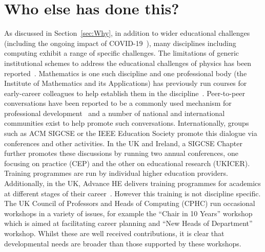 \documentclass[sigconf]{acmart}
\begin{document}
\section{Who else has done this?}
As discussed in Section~\ref{sec:Why}, in addition to wider
educational challenges (including the ongoing impact of
COVID-19~\cite{itnowdigedu:2021,crick-et-ala:iticse2021}), many
disciplines including computing exhibit a range of specific
challenges. The limitations of generic institutional schemes to
address the educational challenges of physics has been
reported~\cite{Magueijo2009}. Mathematics is one such discipline and
one professional body (the Institute of Mathematics and its
Applications) has previously run courses for early-career colleagues
to help establish them in the discipline~\cite{IMA}. Peer-to-peer
conversations have been reported to be a commonly used mechanism for
professional development~\cite{King2004} and a number of national and
international communities exist to help promote such
conversations. Internationally, groups such as ACM SIGCSE or the IEEE
Education Society promote this dialogue via conferences and other
activities.  In the UK and Ireland, a SIGCSE Chapter further promotes
these discussions by running two annual conferences, one focusing on
practice (CEP) and the other on educational research (UKICER).
Training programmes are run by individual higher education
providers. Additionally, in the UK, Advance HE delivers training
programmes for academics at different stages of their
career~\cite{HEATraining}. However this training is not discipline
specific. The UK Council of Professors and Heads of Computing (CPHC) run
occasional workshops in a variety of issues, for example the ``Chair
in 10 Years'' workshop which is aimed at facilitating career planning
and ``New Heads of Department'' workshop. Whilst these are well
received contributions, it is clear that developmental needs are
broader than those supported by these workshops.

\end{document}

